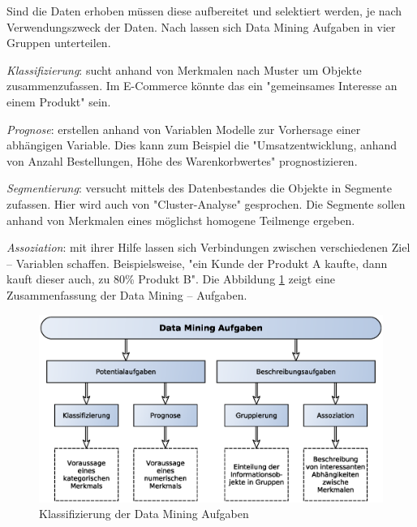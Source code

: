 Sind die Daten erhoben müssen diese aufbereitet und selektiert werden, je nach Verwendungszweck der Daten. Nach \cite{laurenz_data_mining} lassen sich Data Mining Aufgaben in vier Gruppen unterteilen.\vspace{0.2cm}

\textit{Klassifizierung}: sucht anhand von Merkmalen nach Muster um Objekte zusammenzufassen. Im E-Commerce könnte das ein "gemeinsames Interesse an einem Produkt" sein.\vspace{0.2cm}

\textit{Prognose}: erstellen anhand von Variablen Modelle zur Vorhersage einer abhängigen Variable. Dies kann zum Beispiel die "Umsatzentwicklung, anhand von Anzahl Bestellungen, Höhe des Warenkorbwertes" prognostizieren.\vspace{0.2cm}

\textit{Segmentierung}: versucht mittels des Datenbestandes die Objekte in Segmente zufassen. Hier wird auch von "Cluster-Analyse" gesprochen. Die Segmente sollen anhand von Merkmalen eines möglichst homogene Teilmenge ergeben.\vspace{0.2cm}

\textit{Assoziation}: mit ihrer Hilfe lassen sich Verbindungen zwischen verschiedenen Ziel – Variablen schaffen. Beispielsweise, "ein Kunde der Produkt A kaufte, dann kauft dieser auch, zu 80\% Produkt B". Die Abbildung \ref{img:classification_data_mining_tasks} zeigt eine Zusammenfassung der Data Mining – Aufgaben.

\begin{figure}[!ht]
	\centering
	\includegraphics[width=\linewidth]{images/classification_data_mining_tasks.eps}
	\caption{Klassifizierung der Data Mining Aufgaben}
	\label{img:classification_data_mining_tasks}
\end{figure}

